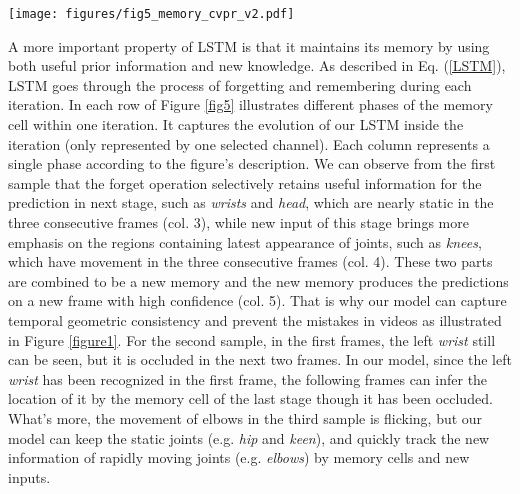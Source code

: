 \documentclass[10pt,twocolumn,letterpaper]{article}
\begin{document}
\begin{figure*}[htbp]
  \center
  \texttt{[image: figures/fig5\_memory\_cvpr\_v2.pdf]}
  \caption{Exploration of LSTM's Memory. a)memory from last stage (\textit{i.e.} ) on last frame , b)memory from last stage (\textit{i.e.} ) on new frame , c)memory after forget operation (\textit{i.e.} ) on new frame  , d)newly selected input(\textit{i.e.} ) on new frame , e)newly formed memory (\textit{i.e.} ) on new frame , which is the element-wise sum of c) and d), and f)the predicted results on new frame . For each samples we pick three consecutive frames.}
  \label{fig5}
  \vspace{-10pt}
\end{figure*}


A more important property of LSTM is that it maintains its memory by using both useful prior information and new knowledge. As described in Eq. (\ref{LSTM}), LSTM goes through the process of forgetting and remembering during each iteration. In each row of Figure \ref{fig5} illustrates different phases of the memory cell within one iteration. It captures the evolution of our LSTM inside the iteration (only represented by one selected channel). Each column represents a single phase according to the figure's description. We can observe from the first sample that the forget operation selectively retains useful information for the prediction in next stage, such as \textit{wrists} and \textit{head}, which are nearly static in the three consecutive frames (col. 3), while new input of this stage brings more emphasis on the regions containing latest appearance of joints, such as \textit{knees}, which have movement in the three consecutive frames (col. 4). These two parts are combined to be a new memory and the new memory produces the predictions on a new frame with high confidence (col. 5). That is why our model can capture temporal geometric consistency and prevent the mistakes in videos as illustrated in Figure \ref{figure1}. For the second sample, in the first frames, the left \textit{wrist} still can be seen, but it is occluded in the next two frames. In our model, since the left \textit{wrist} has been recognized in the first frame, the following frames can infer the location of it by the memory cell of the last stage though it has been occluded. What's more, the movement of elbows in the third sample is flicking, but our model can keep the static joints (e.g. \textit{hip} and \textit{keen}), and quickly track the new information of rapidly moving joints (e.g. \textit{elbows}) by memory cells and new inputs.
\end{document}
